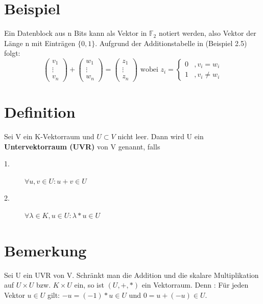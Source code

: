 \documentclass{scrbook}
\begin{document}
\section{Beispiel}
Ein Datenblock aus n Bits kann als Vektor in \(\mathbb{F}_2\) notiert werden, also Vektor der Länge n mit Einträgen \(\{0,1\}\). Aufgrund der Additionstabelle in (Beispiel 2.5) folgt:
\[
\left(
\begin{array}{c}
v_1\\
\vdots\\
v_n
\end{array}
\right)+
\left(
\begin{array}{c}
w_1\\
\vdots\\
w_n
\end{array}
\right) = 
\left(
\begin{array}{c}
z_1\\
\vdots\\
z_n
\end{array}
\right) \text{ wobei } z_i=\left\{\begin{array}{rl}
0&,v_i=w_i\\
1&,v_i\neq w_i
\end{array}
\right.
\]
\section{Definition}
Sei V ein K-Vektorraum und \(U\subset V\) nicht leer. Dann wird U ein \textbf{Untervektorraum (UVR)} von V genannt, falls
\begin{description}
\item[1.] \(\forall u,v\in U:u+v \in U\)
\item[2.]\(\forall\lambda\in K, u\in U: \lambda*u \in U\)
\end{description}
\section{Bemerkung}
Sei U ein UVR von V. Schränkt man die Addition und die skalare Multiplikation auf \(U\times U\) bzw. \(K\times U\) ein, so ist \((U,+,*)\) ein Vektorraum. Denn : Für jeden Vektor \(u\in U\) gilt: \(-u = (-1)*u \in U\) und \(0 = u+(-u)\in U\).
\end{document}
